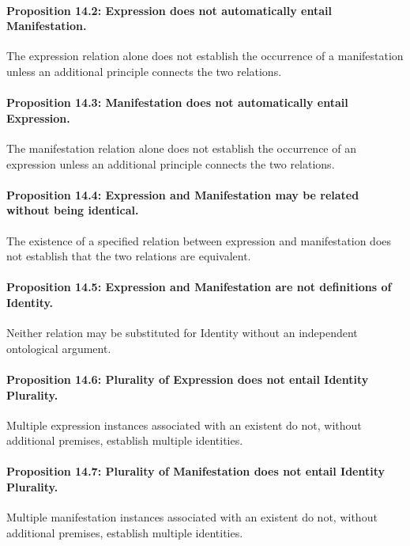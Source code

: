 \paragraph{Proposition 14.2: Expression does not automatically entail Manifestation.}

The expression relation
alone does not establish
the occurrence of a
manifestation unless
an additional principle
connects the two relations.

\paragraph{Proposition 14.3: Manifestation does not automatically entail Expression.}

The manifestation relation
alone does not establish
the occurrence of an
expression unless
an additional principle
connects the two relations.

\paragraph{Proposition 14.4: Expression and Manifestation may be related without being identical.}

The existence of a
specified relation between
expression and manifestation
does not establish
that the two relations
are equivalent.

\paragraph{Proposition 14.5: Expression and Manifestation are not definitions of Identity.}

Neither relation may
be substituted for Identity
without an independent
ontological argument.

\paragraph{Proposition 14.6: Plurality of Expression does not entail Identity Plurality.}

Multiple expression
instances associated
with an existent do
not, without additional
premises, establish
multiple identities.

\paragraph{Proposition 14.7: Plurality of Manifestation does not entail Identity Plurality.}

Multiple manifestation
instances associated
with an existent do
not, without additional
premises, establish
multiple identities.

